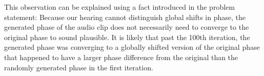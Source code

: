 \documentclass[letterpaper,twocolumn,10pt]{article}
\begin{document}
\vspace{3mm}
\linebreak
This observation can be explained using a fact introduced in the problem statement: Because our hearing cannot distinguish global shifts in phase, the generated phase of the audio clip does not necessarily need to converge to the original phase to sound plausible. It is likely that past the 100th iteration, the generated phase was converging to a globally shifted version of the original phase that happened to have a larger phase difference from the original than the randomly generated phase in the first iteration.
\end{document}
